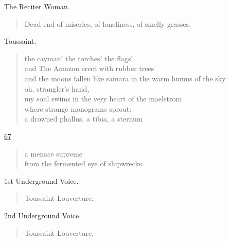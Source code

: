 \documentclass[letterpaper,article,12pt,oneside,notitlepage]{memoir}
\begin{document}
\begin{center}The Reciter Woman.\end{center}

\begin{verse}
Dead end of miseries, of loneliness, of smelly grasses. \\
\end{verse}

\begin{center}Toussaint.\end{center}

\begin{verse}
the cayman! the torches! the flags! \\
and The Amazon erect with rubber trees \\
and the moons fallen like samara in the warm humus of the sky \\
oh, strangler's hand, \\
my soul swims in the very heart of the maelstrom \\
where strange monograms sprout: \\
a drowned phallus, a tibia, a sternum \\
\end{verse}

\clearpage

\href{http://cesaire.elotroalex.com/chiens/chiens/p067.html}{67}

\begin{verse}
a menace supreme \\
from the fermented eye of shipwrecks. \\
\end{verse}

\begin{center}1st Underground Voice.\end{center}

\begin{verse}
\hspace{1cm} Toussaint Louverture. \\
\end{verse}

\begin{center}2nd Underground Voice.\end{center}

\begin{verse}
\hspace{1cm} Toussaint Louverture. \\
\end{verse}
\end{document}
